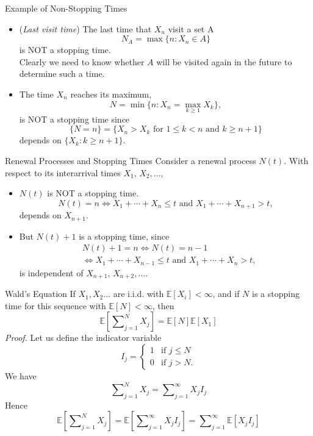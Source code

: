 \documentclass[letterpaper,handout, mathserif]{beamer}
\def\Sum{\sum\nolimits}
\def\E{\mathbb E}
\begin{document}
\begin{frame}{Example of Non-Stopping Times}
\begin{itemize}
\item ({\em Last visit time})
The last time that $X_n$ visit a set A \[N_A = \max\{n: X_n\in A\}\] is NOT a stopping time.\\
Clearly we need to know whether $A$ will be visited again in the future to determine such a time.
\item The time $X_n$ reaches its maximum,
\[N = \min\{n: X_n=\max_{k\ge 1} X_k\},\]
is NOT a stopping time since
\[
\{N=n\}=\{X_n>X_k \text{ for }1\le k<n\text{ and }k\ge n+1\}
\]
depends on $\{X_k: k\ge n+1\}$.
\end{itemize}
\end{frame}
\begin{frame}{Renewal Processes and Stopping Times}
Consider a renewal process $N(t)$.
With respect to its interarrival times $X_1$, $X_2,\ldots$,
\begin{itemize}
\item $N(t)$ is NOT a stopping time.
$$N(t) = n \Leftrightarrow X_1 +\cdots+X_n \le t \mbox{ and } X_1 +\cdots+X_{n+1} > t,$$ depends on $X_{n+1}.$
\item But $N(t)+1$ is a stopping time, since
\begin{align*}
&N(t)+1=n \Leftrightarrow N(t)=n-1\\[-3pt]
&\Leftrightarrow X_1 +\cdots+X_{n-1} \le t \mbox{ and } X_1 +\cdots+X_{n} > t,
\end{align*}
is independent of $X_{n+1}$, $X_{n+2},\ldots.$
\end{itemize}
\end{frame}
\begin{frame}{Wald's Equation}
If $X_1,X_2\ldots$ are i.i.d. with $\E[X_i]<\infty$, and if $N$ is a stopping time
for this sequence with $\E[N]<\infty$, then
$$\E\left[\Sum_{j=1}^N X_j\right]= \E[N]\E[X_1]$$
{\em Proof.}
Let us define the indicator variable
$$I_j =
\begin{cases}
1 &\mbox{if } j \le N\\
0 &\mbox{if } j > N.
\end{cases}
$$
We have
$$\Sum_{j=1}^N X_j=\Sum_{j=1}^{\infty} X_j I_j $$
Hence
\begin{equation}\label{eq:Walds1}
\E\left[\Sum_{j=1}^N X_j\right]= \E\left[\Sum_{j=1}^{\infty} X_jI_j\right]=\Sum_{j=1}^{\infty}\E[X_jI_j]
\end{equation}
\end{frame}
\end{document}

